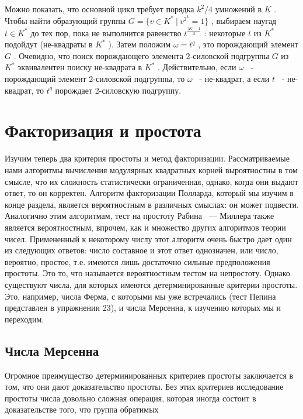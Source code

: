 \documentclass{mai_book}
\begin{document}
Можно показать, что основной цикл требует порядка $k^2/4$
 умножений в $K$
 . Чтобы найти образующий группы $G=\{v\in K^* \ | \ v^{2^k}=1\}$
, выбираем наугад $t\in K^*$
 до тех пор, пока не выполнится равенство $t^{\frac{|K|-1}{2}}$
 : некоторые $t$
 из $K^*$
 подойдут (не-квадраты в $K^*$
    ). Затем положим $\omega = t^q$
 , это порождающий элемент $G$
. Очевидно, что поиск порождающего элемента 2-силовской подгруппы $G$
 из $K^*$
 эквивалентен поиску не-квадрата в $K^*$
 . Действительно, если $\omega$
 ~- порождающий элемент 2-силовской подгруппы, то $\omega$
 ~- не-квадрат, а если $t$
 ~- не-квадрат, то $t^q$
 порождает 2-силовскую подгруппу.

\section{Факторизация и простота}

Изучим теперь два критерия простоты и метод факторизации. Рассматриваемые нами алгоритмы вычисления модулярных квадратных 
корней выроятностны в том смысле, что их сложность статистически 
ограниченная, однако, когда они выдают ответ, то он корректен.  
Алгоритм факторизации Полларда, который мы изучим в конце раздела, 
является вероятностным в различных смыслах: он может подвести. 
Аналогично этим алгоритмам, тест на простоту Рабина ~—  
Миллера также является вероятностным, впрочем, как и множество других 
алгоритмов теории чисел. Примененный к некоторому числу этот  
алгоритм очень быстро дает один из следующих ответов: число составное 
и этот ответ однозначен, или число, вероятно, простое, т.е. имеются 
лишь достаточно сильные предположения простоты. Это то, что  
называется вероятностным тестом на непростоту. Однако существуют 
числа, для которых имеются детерминированные критерии простоты. 
Это, например, числа Ферма, с которыми мы уже встречались (тест 
Пепина представлен в упражнении 23), и числа Мерсенна, к изучению 
которых мы и переходим. 

\subsection{Числа Мерсенна} 

Огромное преимущество детерминированных критериев простоты  
заключается в том, что они дают доказательство простоты. Без этих 
критериев исследование простоты числа довольно сложная операция, 
которая иногда состоит в доказательстве того, что группа обратимых 

\newpage
\end{document}
